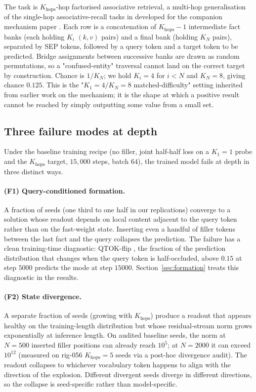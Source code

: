 \documentclass[11pt]{article}
\begin{document}
The task is $K_{\mathrm{hops}}$-hop factorised associative retrieval,
a multi-hop generalisation of the single-hop associative-recall
tasks in \citet{arora2023zoology,arora2024based} developed for the
companion mechanism paper \citep{fenrir2026}. Each row is a concatenation of
$K_{\mathrm{hops}} - 1$ intermediate fact banks (each holding $K_i$
$(k, v)$ pairs) and a final bank (holding $K_N$ pairs), separated by
SEP tokens, followed by a query token and a target token to be
predicted. Bridge assignments between successive banks are drawn as
random permutations, so a "confused-entity" traversal cannot land on
the correct target by construction. Chance is $1/K_N$; we hold
$K_i = 4$ for $i < N$ and $K_N = 8$, giving chance $0.125$. This is
the "$K_1=4/K_N=8$ matched-difficulty" setting inherited from
earlier work on the mechanism; it is the shape at which a positive
result cannot be reached by simply outputting some value from a
small set.

\subsection{Three failure modes at depth}
\label{sec:failures}

Under the baseline training recipe (no filler, joint half-half loss
on a $K_1 = 1$ probe and the $K_{\mathrm{hops}}$ target,
$15{,}000$ steps, batch $64$), the trained model fails at depth in
three distinct ways.

\paragraph{(F1) Query-conditioned formation.} A fraction of seeds
(one third to one half in our replications) converge to a solution
whose readout depends on local content adjacent to the query token
rather than on the fast-weight state. Inserting even a handful of
filler tokens between the last fact and the query collapses the
prediction. The failure has a clean training-time diagnostic:
QTOK-flip \citep{fenrir2026}, the fraction of the prediction
distribution that changes when the query token is half-occluded,
above $0.15$ at step $5000$ predicts the mode at step $15000$.
Section~\ref{sec:formation} treats this diagnostic in the results.

\paragraph{(F2) State divergence.} A separate fraction of seeds
(growing with $K_{\mathrm{hops}}$) produce a readout that
appears healthy on the training-length distribution but whose
residual-stream norm grows exponentially at inference length. On
audited baseline seeds, the norm at $N = 500$ inserted filler
positions can already reach $10^5$; at $N = 2000$ it can exceed
$10^{12}$ (measured on rig-056 $K_{\mathrm{hops}}=5$ seeds via a
post-hoc divergence audit). The readout collapses to whichever vocabulary token
happens to align with the direction of the explosion. Different
divergent seeds diverge in different directions, so the collapse is
seed-specific rather than model-specific.
\end{document}
